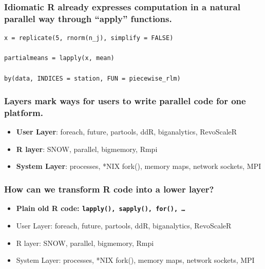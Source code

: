 \documentclass{beamer}
\begin{document}
\begin{frame}[fragile]

    \frametitle{Idiomatic R already expresses computation in a natural
    parallel way through ``apply'' functions.}

\begin{verbatim}
x = replicate(5, rnorm(n_j), simplify = FALSE)

partialmeans = lapply(x, mean)

by(data, INDICES = station, FUN = piecewise_rlm)
\end{verbatim}


\end{frame}
\begin{frame}

    \frametitle{Layers mark ways for users to write parallel code for one
    platform.}

\begin{itemize}
    \item \textbf{User Layer}: foreach, future, partools, ddR, biganalytics, RevoScaleR
    \item \textbf{R layer}: SNOW, parallel, bigmemory, Rmpi
    \item \textbf{System Layer}: processes, *NIX fork(), memory maps, network sockets,
    MPI
\end{itemize}

\end{frame}
\begin{frame}

    \frametitle{How can we transform R code into a lower layer?}

\begin{itemize}
    \item \textbf{Plain old R code: \texttt{lapply(), sapply(), for(), \dots}}
\item User Layer: foreach, future, partools, ddR, biganalytics, RevoScaleR
\item R layer: SNOW, parallel, bigmemory, Rmpi
\item System Layer: processes, *NIX fork(), memory maps, network sockets,
    MPI
\end{itemize}


%
%
%
%
%

\end{frame}
\end{document}
